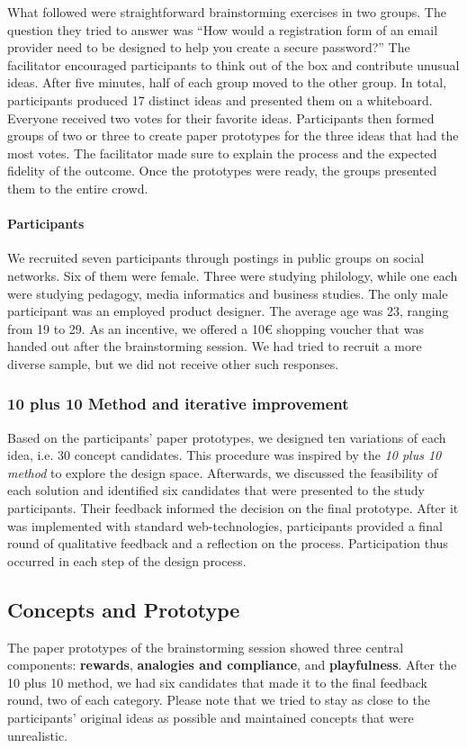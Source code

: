 What followed were straightforward brainstorming exercises in two groups. The question they tried to answer was ``How would a registration form of an email provider need to be designed to help you create a secure password?'' The facilitator encouraged participants to think out of the box and contribute unusual ideas. After five minutes, half of each group moved to the other group. In total, participants produced 17 distinct ideas and presented them on a whiteboard. Everyone received two votes for their favorite ideas. Participants then formed groups of two or three to create paper prototypes for the three ideas that had the most votes. The facilitator made sure to explain the process and the expected fidelity of the outcome. Once the prototypes were ready, the groups presented them to the entire crowd.

\paragraph{Participants}
We recruited seven participants through postings in public groups on social networks. Six of them were female. Three were studying philology, while one each were studying pedagogy, media informatics and business studies. The only male participant was an employed product designer. The average age was 23, ranging from 19 to 29. As an incentive, we offered a 10€ shopping voucher that was handed out after the brainstorming session. We had tried to recruit a more diverse sample, but we did not receive other such responses. 

\subsubsection{10 plus 10 Method and iterative improvement}
Based on the participants' paper prototypes, we designed ten variations of each idea, i.e. 30 concept candidates. This procedure was inspired by the \textit{10 plus 10 method} to explore the design space. %
Afterwards, we discussed the feasibility of each solution and identified six candidates that were presented to the study participants. Their feedback informed the decision on the final prototype. After it was implemented with standard web-technologies, participants provided a final round of qualitative feedback and a reflection on the process. Participation thus occurred in each step of the design process. 

\subsection{Concepts and Prototype}
The paper prototypes of the brainstorming session showed three central components: \textbf{rewards}, \textbf{analogies and compliance}, and \textbf{playfulness}. After the 10 plus 10 method, we had six candidates that made it to the final feedback round, two of each category. Please note that we tried to stay as close to the participants' original ideas as possible and maintained concepts that were unrealistic. 
